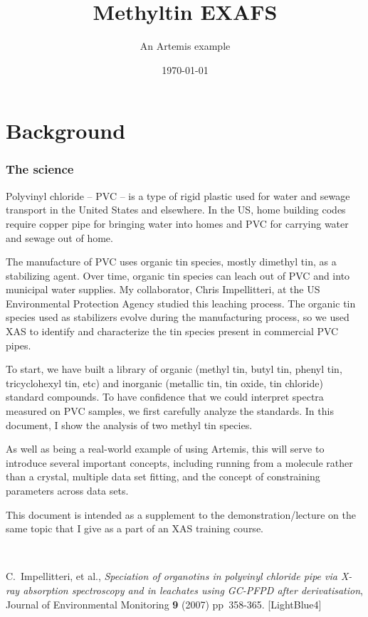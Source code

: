 \documentclass[10pt, xcolor=x11names, compress, handout]{beamer}
\title{Methyltin EXAFS}%
\subtitle{An Artemis example}
\date{\today}
\begin{document}
\maketitle


\section{Background}

\begin{frame}
  \frametitle{The science}
  \footnotesize%
  Polyvinyl chloride -- PVC -- is a type of rigid plastic used for
  water and sewage transport in the United States and elsewhere.  In
  the US, home building codes require copper pipe for bringing water
  into homes and PVC for carrying water and sewage out of home.

  \medskip

  The manufacture of PVC uses organic tin species, mostly dimethyl
  tin, as a stabilizing agent.  Over time, organic tin species can
  leach out of PVC and into municipal water supplies.  My collaborator,
  Chris Impellitteri, at the US Environmental Protection Agency studied
  this leaching process.  The organic tin species used as stabilizers
  evolve during the manufacturing process, so we used XAS to identify
  and characterize the tin species present in commercial PVC pipes.

  \medskip

  To start, we have built a library of organic (methyl tin, butyl tin,
  phenyl tin, tricyclohexyl tin, etc) and inorganic (metallic tin, tin
  oxide, tin chloride) standard compounds.  To have confidence that we
  could interpret spectra measured on PVC samples, we first carefully
  analyze the standards.  In this document, I show the analysis of two
  methyl tin species.

  \medskip

  As well as being a real-world example of using Artemis, this will
  serve to introduce several important concepts, including running
  {\feff} from a molecule rather than a crystal, multiple data set
  fitting, and the concept of constraining parameters across data
  sets.

  \medskip

  This document is intended as a supplement to the
  demonstration/lecture on the same topic that I give as a part of an
  XAS training course.

  \medskip

  ~

  \begin{bottomnote}[0.7][18.75]
    C.\ Impellitteri, et al., \textit{Speciation of organotins in
      polyvinyl chloride pipe via X-ray absorption spectroscopy and in
      leachates using GC-PFPD after derivatisation}, Journal of
    Environmental Monitoring \textbf{9} (2007) pp\ 358-365.
    [LightBlue4]
  \end{bottomnote}
\end{frame}
\end{document}
